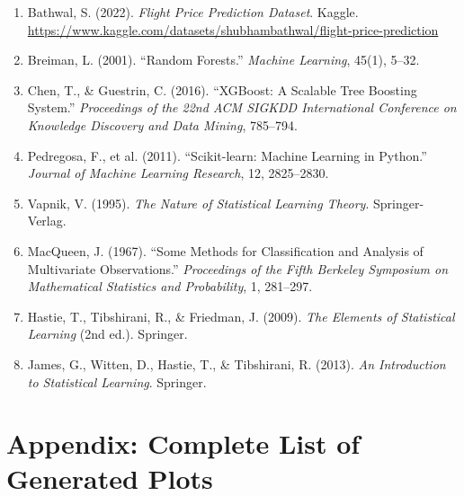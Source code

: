 \documentclass[12pt, a4paper]{article}
\begin{document}
\begin{enumerate}[leftmargin=*]
    \item Bathwal, S. (2022). \textit{Flight Price Prediction Dataset}. Kaggle. \url{https://www.kaggle.com/datasets/shubhambathwal/flight-price-prediction}
    
    \item Breiman, L. (2001). ``Random Forests.'' \textit{Machine Learning}, 45(1), 5--32.
    
    \item Chen, T., \& Guestrin, C. (2016). ``XGBoost: A Scalable Tree Boosting System.'' \textit{Proceedings of the 22nd ACM SIGKDD International Conference on Knowledge Discovery and Data Mining}, 785--794.
    
    \item Pedregosa, F., et al. (2011). ``Scikit-learn: Machine Learning in Python.'' \textit{Journal of Machine Learning Research}, 12, 2825--2830.
    
    \item Vapnik, V. (1995). \textit{The Nature of Statistical Learning Theory}. Springer-Verlag.
    
    \item MacQueen, J. (1967). ``Some Methods for Classification and Analysis of Multivariate Observations.'' \textit{Proceedings of the Fifth Berkeley Symposium on Mathematical Statistics and Probability}, 1, 281--297.
    
    \item Hastie, T., Tibshirani, R., \& Friedman, J. (2009). \textit{The Elements of Statistical Learning} (2nd ed.). Springer.
    
    \item James, G., Witten, D., Hastie, T., \& Tibshirani, R. (2013). \textit{An Introduction to Statistical Learning}. Springer.
\end{enumerate}

\newpage

\appendix
\section{Appendix: Complete List of Generated Plots}
\end{document}

